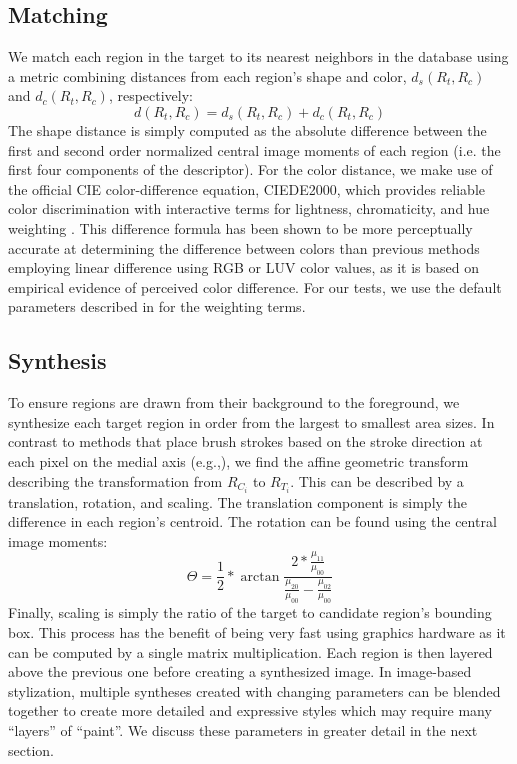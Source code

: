 \documentclass[a4paper,11pt,final]{ThesisStyle}
\begin{document}
\subsection{Matching}\vspace{-0.4em}
We match each region in the target to its nearest neighbors in the database using a metric combining distances from each region's shape and color, $d_s(R_t, R_c)$ and $d_c(R_t, R_c)$, respectively:  
\begin{equation}
d(R_t, R_c) = d_s(R_t, R_c) + d_c(R_t, R_c)
\end{equation}
\label{eq:distance}
The shape distance is simply computed as the absolute difference between the first and second order normalized central image moments of each region (i.e. the first four components of the descriptor).  For the color distance, we make use of the official CIE color-difference equation, CIEDE2000, which provides reliable color discrimination with interactive terms for lightness, chromaticity, and hue weighting \cite{Luo2001}.   This difference formula has been shown to be more perceptually accurate at determining the difference between colors than previous methods employing linear difference using RGB or LUV color values, as it is based on empirical evidence of perceived color difference.  For our tests, we use the default parameters described in \cite{Luo2001} for the weighting terms.
\subsection{Synthesis}\vspace{-0.4em}
To ensure regions are drawn from their background to the foreground, we synthesize each target region in order from the largest to smallest area sizes.  In contrast to methods that place brush strokes based on the stroke direction at each pixel on the medial axis (e.g.,\cite{Wang2004a}), we find the affine geometric transform describing the transformation from $R_{C_i}$ to $R_{T_i}$.  This can be described by a translation, rotation, and scaling.  The translation component is simply the difference in each region's centroid.  The rotation can be found using the central image moments: 
\begin{equation}
\Theta = \frac{1}{2} * \arctan  \dfrac{ 2 * \frac{\mu_{11}}{\mu_{00}} } { \frac{\mu_{20}}{\mu_{00}} - \frac{\mu_{02}}{\mu_{00}} }
\end{equation}
Finally, scaling is simply the ratio of the target to candidate region's bounding box.  This process has the benefit of being very fast using graphics hardware as it can be computed by a single matrix multiplication.  Each region is then layered above the previous one before creating a synthesized image.  In image-based stylization, multiple syntheses created with changing parameters can be blended together to create more detailed and expressive styles which may require many ``layers'' of ``paint''.  We discuss these parameters in greater detail in the next section.
\end{document}
